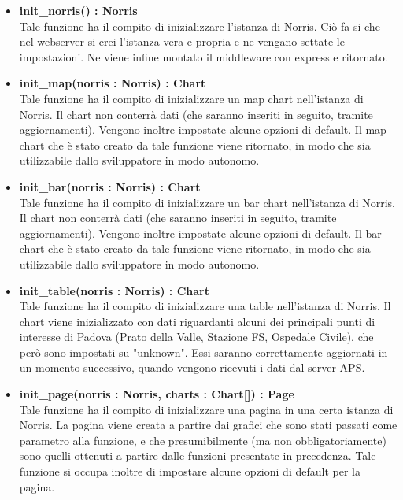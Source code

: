         \begin{itemize}

            \item \textbf{init\_norris() : Norris} \\
            Tale funzione ha il compito di inizializzare l'istanza di Norris. Ciò fa si che nel webserver si crei l'istanza vera e propria e ne vengano settate le impostazioni. Ne viene infine montato il middleware con express e ritornato.
            
            \item \textbf{init\_map(norris : Norris) : Chart} \\
            Tale funzione ha il compito di inizializzare un map chart nell'istanza di Norris. Il chart non conterrà dati (che saranno inseriti in seguito, tramite aggiornamenti). Vengono inoltre impostate alcune opzioni di default. Il map chart che è stato creato da tale funzione viene ritornato, in modo che sia utilizzabile dallo sviluppatore in modo autonomo.
            
            \item \textbf{init\_bar(norris : Norris) : Chart} \\
            Tale funzione ha il compito di inizializzare un bar chart nell'istanza di Norris. Il chart non conterrà dati (che saranno inseriti in seguito, tramite aggiornamenti). Vengono inoltre impostate alcune opzioni di default. Il bar chart che è stato creato da tale funzione viene ritornato, in modo che sia utilizzabile dallo sviluppatore in modo autonomo.
            
            \item \textbf{init\_table(norris : Norris) : Chart} \\
            Tale funzione ha il compito di inizializzare una table nell'istanza di Norris. Il chart viene inizializzato con dati riguardanti alcuni dei principali punti di interesse di Padova (Prato della Valle, Stazione FS, Ospedale Civile), che però sono impostati su "unknown". Essi saranno correttamente aggiornati in un momento successivo, quando vengono ricevuti i dati dal server APS.
            
            \item \textbf{init\_page(norris : Norris, charts : Chart[]) : Page} \\
            Tale funzione ha il compito di inizializzare una pagina in una certa istanza di Norris. La pagina viene creata a partire dai grafici che sono stati passati come parametro alla funzione, e che presumibilmente (ma non obbligatoriamente) sono quelli ottenuti a partire dalle funzioni presentate in precedenza. Tale funzione si occupa inoltre di impostare alcune opzioni di default per la pagina.
            

\end{itemize}

